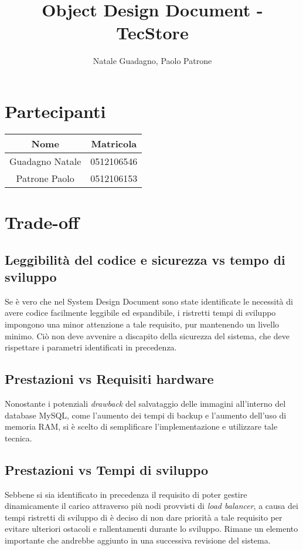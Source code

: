 \documentclass[12pt,a4paper]{article}
\author{Natale Guadagno, Paolo Patrone}
\title{Object Design Document - TecStore}
\begin{document}
\maketitle
\newpage
\tableofcontents
\newpage
{}
\section*{Partecipanti}
\begin{center}
\begin{tabular} {|c|c|}
\hline
\textbf{Nome} & \textbf{Matricola} \\
\hline
Guadagno Natale & 0512106546 \\
Patrone Paolo & 0512106153 \\
\hline
\end{tabular}
\end{center}
\newpage

\section{Trade-off}
\subsection{Leggibilit\`a del codice e sicurezza vs tempo di sviluppo}
Se \`e vero che nel System Design Document sono state identificate le necessit\`a di avere codice facilmente leggibile ed espandibile, i ristretti tempi di sviluppo impongono una minor attenzione a tale requisito, pur mantenendo un livello minimo. Ci\`o non deve avvenire a discapito della sicurezza del sistema, che deve rispettare i parametri identificati in precedenza.

\subsection{Prestazioni vs Requisiti hardware}
Nonostante i potenziali \emph{drawback} del salvataggio delle immagini all'interno del database MySQL, come l'aumento dei tempi di backup e l'aumento dell'uso di memoria RAM, si è scelto di semplificare l'implementazione e utilizzare tale tecnica.

\subsection{Prestazioni vs Tempi di sviluppo}
Sebbene si sia identificato in precedenza il requisito di poter gestire dinamicamente il carico attraverso più nodi provvisti di \emph{load balancer}, a causa dei tempi ristretti di sviluppo di è deciso di non dare priorità a tale requisito per evitare ulteriori ostacoli e rallentamenti durante lo sviluppo. Rimane un elemento importante che andrebbe aggiunto in una successiva revisione del sistema.
\end{document}
